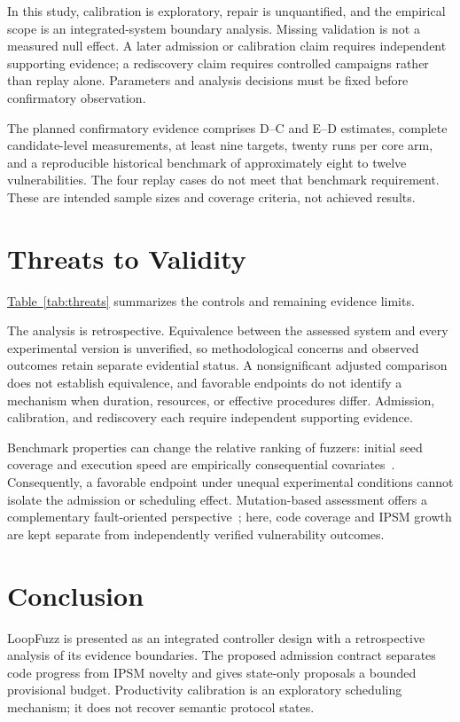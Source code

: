 \documentclass[final,5p,times,number]{elsarticle}
\newcommand{\namedref}[2]{\hyperref[#2]{#1~\ref*{#2}}}
\begin{document}
In this study, calibration is exploratory, repair is unquantified, and the empirical scope is an integrated-system boundary analysis. Missing validation is not a measured null effect. A later admission or calibration claim requires independent supporting evidence; a rediscovery claim requires controlled campaigns rather than replay alone. Parameters and analysis decisions must be fixed before confirmatory observation.

The planned confirmatory evidence comprises D--C and E--D estimates, complete candidate-level measurements, at least nine targets, twenty runs per core arm, and a reproducible historical benchmark of approximately eight to twelve vulnerabilities. The four replay cases do not meet that benchmark requirement. These are intended sample sizes and coverage criteria, not achieved results.

\section{Threats to Validity}
\namedref{Table}{tab:threats} summarizes the controls and remaining evidence limits.
\label{sec:threats}


The analysis is retrospective. Equivalence between the assessed system and every experimental version is unverified, so methodological concerns and observed outcomes retain separate evidential status. A nonsignificant adjusted comparison does not establish equivalence, and favorable endpoints do not identify a mechanism when duration, resources, or effective procedures differ. Admission, calibration, and rediscovery each require independent supporting evidence.

Benchmark properties can change the relative ranking of fuzzers: initial seed coverage and execution speed are empirically consequential covariates~\cite{benchmarkproperties}. Consequently, a favorable endpoint under unequal experimental conditions cannot isolate the admission or scheduling effect. Mutation-based assessment offers a complementary fault-oriented perspective~\cite{mutationassessment2023}; here, code coverage and IPSM growth are kept separate from independently verified vulnerability outcomes.

\section{Conclusion}
LoopFuzz is presented as an integrated controller design with a retrospective analysis of its evidence boundaries. The proposed admission contract separates code progress from IPSM novelty and gives state-only proposals a bounded provisional budget. Productivity calibration is an exploratory scheduling mechanism; it does not recover semantic protocol states.
\end{document}
